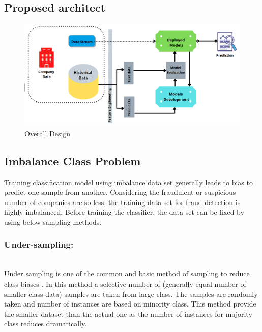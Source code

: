 

\subsection{Proposed architect}\label{subsec:propsed-architech}
\begin{figure}[htp]
    \centering
    \includegraphics[width=\linewidth]{figures/overall_design.PNG}
    \caption{Overall Design}
    \label{fig:design}
\end{figure}


\subsection{Imbalance Class Problem}\label{subsec:imbalance-class-problem}
Training classification model using imbalance data set generally leads to bias to predict one sample from another. Considering the fraudulent or suspicious number of companies are so less, the training data set for fraud detection is highly imbalanced. Before training the classifier, the data set can be fixed by using below sampling methods.    
\subsubsection{Under-sampling:}\hspace*{\fill} \\
Under sampling is one of the common and basic method of sampling to reduce class biases \cite{10.1145/3055635.3056643}. In this method a selective number of (generally equal number of smaller class data) samples are taken from large class. The samples are randomly taken and number of instances are based on minority class. This method provide the smaller dataset than the actual one as the number of instances for majority class reduces dramatically. 
